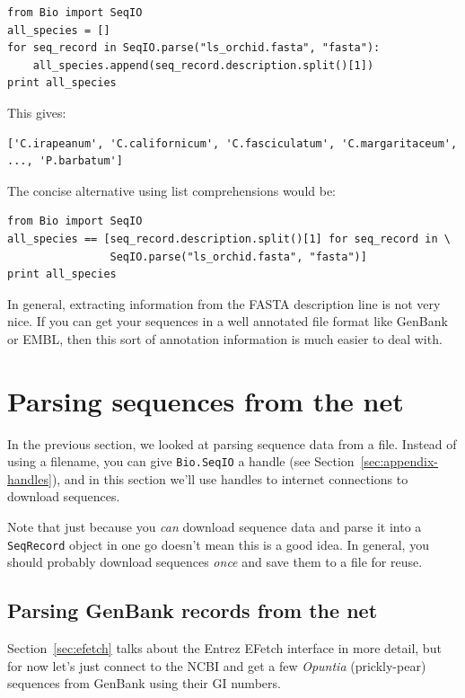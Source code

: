 \documentclass{report}
\begin{document}
\begin{verbatim}
from Bio import SeqIO
all_species = []
for seq_record in SeqIO.parse("ls_orchid.fasta", "fasta"):
    all_species.append(seq_record.description.split()[1])
print all_species
\end{verbatim}

\noindent This gives:

\begin{verbatim}
['C.irapeanum', 'C.californicum', 'C.fasciculatum', 'C.margaritaceum', ..., 'P.barbatum']
\end{verbatim}

The concise alternative using list comprehensions would be:

\begin{verbatim}
from Bio import SeqIO
all_species == [seq_record.description.split()[1] for seq_record in \
                SeqIO.parse("ls_orchid.fasta", "fasta")]
print all_species
\end{verbatim}

In general, extracting information from the FASTA description line is not very nice.
If you can get your sequences in a well annotated file format like GenBank or EMBL,
then this sort of annotation information is much easier to deal with.

\section{Parsing sequences from the net}
\label{sec:SeqIO_Online}
In the previous section, we looked at parsing sequence data from a file.
Instead of using a filename, you can give \verb|Bio.SeqIO| a handle
(see Section~\ref{sec:appendix-handles}), and in this section
we'll use handles to internet connections to download sequences.

Note that just because you \emph{can} download sequence data and parse it into
a \verb|SeqRecord| object in one go doesn't mean this is a good idea.
In general, you should probably download sequences \emph{once} and save them to
a file for reuse.

\subsection{Parsing GenBank records from the net}
\label{sec:SeqIO_GenBank_Online}
Section~\ref{sec:efetch} talks about the Entrez EFetch interface in more detail,
but for now let's just connect to the NCBI and get a few \textit{Opuntia} (prickly-pear)
sequences from GenBank using their GI numbers.
\end{document}

